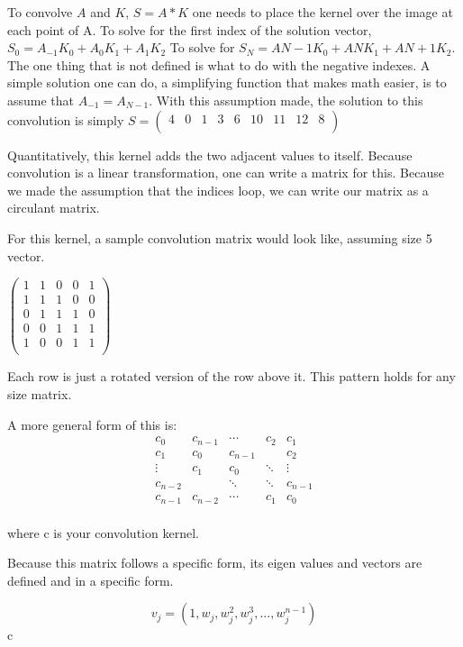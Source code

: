 \documentclass[11pt]{article}
\begin{document}
To convolve $A$ and $K$, $S = A*K$ one needs to place the kernel over the image at each point of A. To solve for the first index of the solution vector, $S_0 = A_{-1}K_{0}+A_{0}K_{1}+A_{1}K_{2}$ To solve for $S_N = A{N-1}K_{0}+A{N}K_{1}+A{N+1}K_{2}$. The one thing that is not defined is what to do with the negative indexes. A simple solution one can do, a simplifying function that makes math easier, is to assume that $A_{-1} = A_{N-1}$. With this assumption made, the solution to this convolution is simply 
$ S = \begin{pmatrix}
	4 & 0 & 1 & 3 & 6 & 10 & 11 & 12 & 8\\
\end{pmatrix}$

Quantitatively, this kernel adds the two adjacent values to itself. Because convolution is a linear transformation, one can write a matrix for this. Because we made the assumption that the indices loop, we can write our matrix as a circulant matrix. 

For this kernel, a sample convolution matrix would look like, assuming size 5 vector. 

$\begin{pmatrix}
	1 & 1 & 0 & 0 & 1\\
	1 & 1 & 1 & 0 & 0\\
	0 & 1 & 1 & 1 & 0\\
	0 & 0 & 1 & 1 & 1 \\
	1 & 0 & 0 & 1 & 1\\
\end{pmatrix}$

Each row is just a rotated version of the row above it. This pattern holds for any size matrix.

A more general form of this is:
$$\begin{matrix}
	c_0 & c_{n-1} & \cdots & c_2 & c_1\\
	c_1 & c_0 & c_{n-1} &  & c_2\\
	\vdots & c_1 & c_0 & \ddots & \vdots\\
	c_{n-2} &   & \ddots & \ddots & c_{n-1}\\
	c_{n-1} & c_{n-2} & \cdots & c_1 & c_0\\
\end{matrix}$$

where c is your convolution kernel. 

Because this matrix follows a specific form, its eigen values and vectors are defined and in a specific form.

$$v_j = (1, w_j, w_j^2, w_j^3, ..., w_j^{n-1})$$
c
\end{document}
